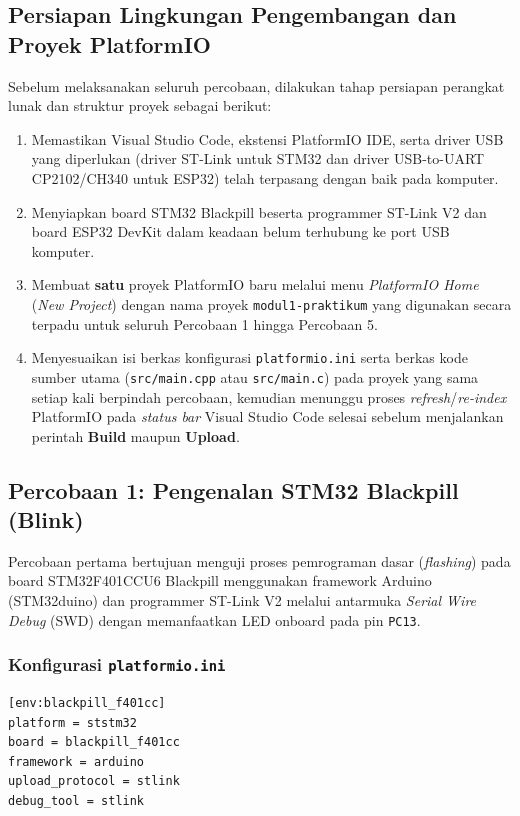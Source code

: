 \subsection{Persiapan Lingkungan Pengembangan dan Proyek PlatformIO}

Sebelum melaksanakan seluruh percobaan, dilakukan tahap persiapan perangkat lunak dan struktur proyek sebagai berikut:
\begin{enumerate}[label=\arabic*.]
    \item Memastikan Visual Studio Code, ekstensi PlatformIO IDE, serta driver USB yang diperlukan (driver ST-Link untuk STM32 dan driver USB-to-UART CP2102/CH340 untuk ESP32) telah terpasang dengan baik pada komputer.
    \item Menyiapkan board STM32 Blackpill beserta programmer ST-Link V2 dan board ESP32 DevKit dalam keadaan belum terhubung ke port USB komputer.
    \item Membuat \textbf{satu} proyek PlatformIO baru melalui menu \textit{PlatformIO Home} (\textit{New Project}) dengan nama proyek \texttt{modul1-praktikum} yang digunakan secara terpadu untuk seluruh Percobaan 1 hingga Percobaan 5.
    \item Menyesuaikan isi berkas konfigurasi \texttt{platformio.ini} serta berkas kode sumber utama (\texttt{src/main.cpp} atau \texttt{src/main.c}) pada proyek yang sama setiap kali berpindah percobaan, kemudian menunggu proses \textit{refresh}/\textit{re-index} PlatformIO pada \textit{status bar} Visual Studio Code selesai sebelum menjalankan perintah \textbf{Build} maupun \textbf{Upload}.
\end{enumerate}

\subsection{Percobaan 1: Pengenalan STM32 Blackpill (Blink)}

Percobaan pertama bertujuan menguji proses pemrograman dasar (\textit{flashing}) pada board STM32F401CCU6 Blackpill menggunakan framework Arduino (STM32duino) dan programmer ST-Link V2 melalui antarmuka \textit{Serial Wire Debug} (SWD) dengan memanfaatkan LED onboard pada pin \texttt{PC13}.

\subsubsection*{Konfigurasi \texttt{platformio.ini}}
\begin{lstlisting}
[env:blackpill_f401cc]
platform = ststm32
board = blackpill_f401cc
framework = arduino
upload_protocol = stlink
debug_tool = stlink
\end{lstlisting}

